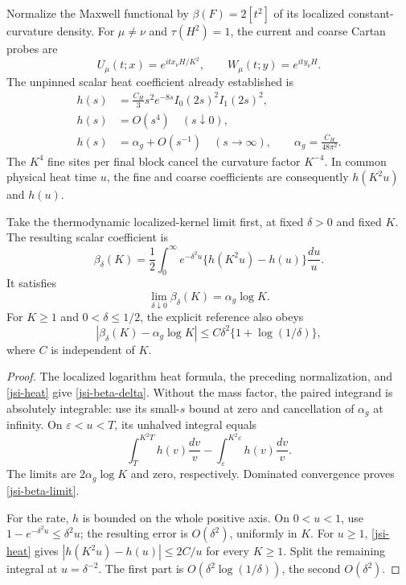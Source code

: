 Normalize the Maxwell functional by
\(\beta(F)=2[t^2]\) of its localized constant-curvature density.
For \(\mu\ne\nu\) and \(\tau(H^2)=1\), the current and coarse
Cartan probes are
\[
 U_\mu(t;x)=e^{itx_\nu H/K^2},\qquad
 W_\mu(t;y)=e^{ity_\nu H}.
\]
The unpinned scalar heat coefficient already established is
\begin{equation}
 \begin{split}
 h(s)&=\frac{C_H}{3}s^2e^{-8s}I_0(2s)^2I_1(2s)^2,\\
 h(s)&=O(s^4)\quad(s\downarrow0),\\
 h(s)&=\alpha_g+O(s^{-1})\quad(s\to\infty),
 \qquad \alpha_g=\frac{C_H}{48\pi^2}.
 \end{split}
 \label{jsi-heat}
\end{equation}
The \(K^4\) fine sites per final block cancel the curvature
factor \(K^{-4}\). In common physical heat time \(u\), the fine
and coarse coefficients are consequently \(h(K^2u)\) and \(h(u)\).

\begin{proposition}
\label{jsi-ordered-theorem}
Take the thermodynamic localized-kernel limit first, at fixed
\(\delta>0\) and fixed \(K\). The resulting scalar coefficient is
\begin{equation}
 \beta_\delta(K)=\frac12\int_0^\infty
           e^{-\delta^2u}\{h(K^2u)-h(u)\}\frac{du}{u}.
 \label{jsi-beta-delta}
\end{equation}
It satisfies
\begin{equation}
             \lim_{\delta\downarrow0}\beta_\delta(K)
                         =\alpha_g\log K.
 \label{jsi-beta-limit}
\end{equation}
For \(K\ge1\) and \(0<\delta\le1/2\), the explicit reference
also obeys
\begin{equation}
 |\beta_\delta(K)-\alpha_g\log K|
       \le C\delta^2\{1+\log(1/\delta)\},
 \label{jsi-mass-rate}
\end{equation}
where \(C\) is independent of \(K\).
\end{proposition}

\begin{proof}
The localized logarithm heat formula, the preceding normalization,
and \eqref{jsi-heat} give \eqref{jsi-beta-delta}.
Without the mass factor, the paired integrand is absolutely
integrable: use its small-\(s\) bound at zero and cancellation
of \(\alpha_g\) at infinity. On \(\varepsilon<u<T\), its
unhalved integral equals
\[
 \int_T^{K^2T}h(v)\frac{dv}{v}
       -\int_\varepsilon^{K^2\varepsilon}h(v)\frac{dv}{v}.
\]
The limits are \(2\alpha_g\log K\) and zero, respectively.
Dominated convergence proves \eqref{jsi-beta-limit}.

For the rate, \(h\) is bounded on the whole positive axis.
On \(0<u<1\), use \(1-e^{-\delta^2u}\le\delta^2u\);
the resulting error is \(O(\delta^2)\), uniformly in \(K\).
For \(u\ge1\), \eqref{jsi-heat} gives
\(|h(K^2u)-h(u)|\le2C/u\) for every \(K\ge1\).
Split the remaining integral at \(u=\delta^{-2}\).
The first part is \(O(\delta^2\log(1/\delta))\), the
second \(O(\delta^2)\).
\end{proof}

